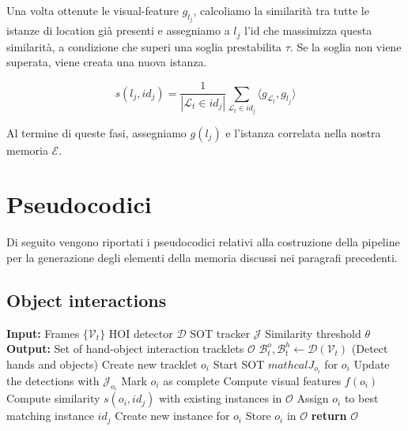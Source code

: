 Una volta ottenute le visual-feature $g_{l_j}$, calcoliamo la similarità tra tutte le istanze di location già presenti e assegniamo a $l_j$ l'id che massimizza questa similarità, a condizione che superi una soglia prestabilita $\tau$. Se la soglia non viene superata, viene creata una nuova istanza.

\[
s(l_j, id_j) = \frac{1}{|\mathcal{L}_t \in id_j|} \sum_{\mathcal{L}_t \in id_j} \langle g_{\mathcal{L}_t}, g_{l_j} \rangle
\]

Al termine di queste fasi, assegniamo $g(l_j)$ e l'istanza correlata nella nostra memoria $\mathcal{E}$.

\section{Pseudocodici}
Di seguito vengono riportati i pseudocodici relativi alla costruzione della pipeline per la generazione degli elementi della memoria discussi nei paragrafi precedenti.
\subsection*{Object interactions}
\begin{algorithm}[H]
    \caption{Object interactions pipeline}
    \begin{algorithmic}[1]
    \State \textbf{Input:}
    \State \quad Frames $\{\mathcal{V}_t\}$
    \State \quad HOI detector $\mathcal{D}$
    \State \quad SOT tracker $\mathcal{J}$
    \State \quad Similarity threshold $\theta$
    \State \textbf{Output:}
    \State \quad Set of hand-object interaction tracklets $\mathcal{O}$
        \State $\mathcal{B}_t^o, \mathcal{B}_t^h \gets \mathcal{D}(\mathcal{V}_t)$ (Detect hands and objects)
                \State Create new tracklet $o_i$
                \State Start SOT $mathcal{J}_{o_i}$ for $o_i$
            \EndIf
        \EndFor
            \State Update the detections with $\mathcal{J}_{o_i}$
                \State Mark $o_i$ as complete
            \EndIf
        \EndFor
    \EndFor
        \State Compute visual features $f(o_i)$
        \State Compute similarity $s(o_i, id_j)$ with existing instances in $\mathcal{O}$
            \State Assign $o_i$ to best matching instance $id_j$
        \Else
            \State Create new instance for $o_i$
        \EndIf
        \State Store $o_i$ in $\mathcal{O}$
    \EndFor
    \State \textbf{return} $\mathcal{O}$
    \end{algorithmic}
\end{algorithm}

